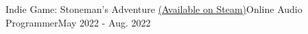 \resumeSubheading
   {Indie Game: Stoneman's Adventure \href{https://store.steampowered.com/app/2434860/Stonemans_Adventure/}{(Available on Steam)}}{Online}
   {Audio Programmer}{May 2022 - Aug. 2022}
   \resumeItemListStart
   \resumeItemListEnd
